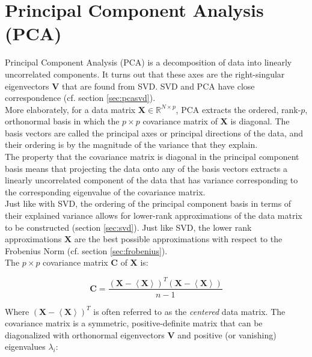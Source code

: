 \section{Principal Component Analysis (PCA)}

Principal Component Analysis (PCA) is a decomposition of data into linearly uncorrelated components. It turns out that these axes are the right-singular eigenvectors $\mathbf{V}$ that are found from SVD. SVD and PCA have close correspondence (cf. section \ref{sec:pcasvd}).
\\

More elaborately, for a data matrix $\mathbf{X}\in\mathbb{R}^{N\times p}$, PCA extracts the ordered, rank-$p$, orthonormal basis in which the $p\times p$ covariance matrix of $\mathbf{X}$ is diagonal. The basis vectors are called the principal axes or principal directions of the data, and their ordering is by the magnitude of the variance that they explain. 
\\

The property that the covariance matrix is diagonal in the principal component basis means that projecting the data onto any of the basis vectors extracts a linearly uncorrelated component of the data that has variance corresponding to the corresponding eigenvalue of the covariance matrix.
\\

Just like with SVD, the ordering of the principal component basis in terms of their explained variance allows for lower-rank approximations of the data matrix to be constructed (section \ref{sec:svd}). Just like SVD, the lower rank approximations $\mathbf{X}$ are the best possible approximations with respect to the Frobenius Norm (cf. section \ref{sec:frobenius}). 
\\

The $p\times p$ covariance matrix  $\mathbf{C}$ of $\mathbf{X}$ is:

\begin{equation}
\mathbf{C} = \frac{\left(\mathbf{X}-\left<\mathbf{X}\right>\right)^T\left(\mathbf{X}-\left< \mathbf{X}\right>\right)}{n-1}
\end{equation}

Where $\left(\mathbf{X}-\left<\mathbf{X}\right>\right)^T$ is often referred to as the \textit{centered} data matrix. The covariance matrix is a symmetric, positive-definite matrix that can be diagonalized with orthonormal eigenvectors $\mathbf{V}$ and positive (or vanishing) eigenvalues $\lambda_i$:

